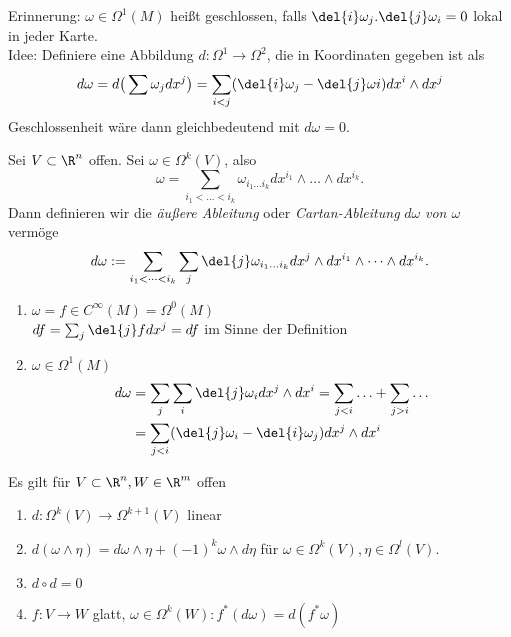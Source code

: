 Erinnerung: \lecture $ \omega \in \Omega^1(M) $ heißt geschlossen, falls $ \del{i}\omega_j . \del{j} \omega_i = 0 $ lokal in jeder Karte.\\
Idee: Definiere eine Abbildung $ d: \Omega^1 \to \Omega^2 $, die in Koordinaten gegeben ist als
\[ d\omega = d \big( \sum \omega_j dx^j \big) = \sum_{i < j} (\del{i} \omega_j - \del{j} \omega i) dx^i \wedge dx^j \]
Geschlossenheit wäre dann gleichbedeutend mit $d\omega = 0$.

\begin{defn}  \label{7.5}
	Sei $ V \subset \R^n $ offen. Sei $ \omega \in \Omega^k(V) $, also 
	\[ \omega = \sum_{i_1 < \dots < i_k} \omega_{i_1 \dots i_k} dx^{i_1} \wedge \dots \wedge dx^{i_k}. \]
	Dann definieren wir die \emph{äußere Ableitung} oder \emph{Cartan-Ableitung} $d\omega$ \emph{von $\omega$} vermöge
	\[ d\omega := \sum_{i_1 < \dots < i_k} \sum_j \del{j} \omega_{i_1 \dots i_k} dx^j \wedge dx^{i_1} \wedge \dots \wedge dx^{i_k}. \]
\end{defn}

\begin{rem*}
	\begin{enumerate}[label={\roman*})]
		\item $ \omega = f \in C^\infty(M) = \Omega^0(M) $\\
			$ df = \sum_j \del{j} f dx^j = df $ im Sinne der Definition
		\item $ \omega \in \Omega^1(M) $
			\begin{align*}
				d\omega &= \sum_j \sum_i \del{j}\omega_i dx^j \wedge dx^i = \sum_{j<i} \dotsc + \sum_{j > i} \dots\\
				&= \sum_{j<i} (\del{j} \omega_i - \del{i}\omega_j) dx^j \wedge dx^i
			\end{align*}
	\end{enumerate}
\end{rem*}

\begin{lem}
	Es gilt für $ V \subset \R^n, W \in \R^m $ offen
	\begin{enumerate}[label={\roman*})]
		\item $ d: \Omega^k(V) \to \Omega^{k+1}(V) $ linear
		\item $ d(\omega \wedge \eta) = d\omega \wedge \eta + (-1)^k \omega \wedge d\eta $ für $ \omega \in \Omega^k(V), \eta \in \Omega^l(V). $
		\item $d \circ d = 0$
		\item $ f: V \to W $ glatt, $\omega \in \Omega^k(W): f^*(d\omega) = d(f^*\omega)$
	\end{enumerate}
\end{lem}

